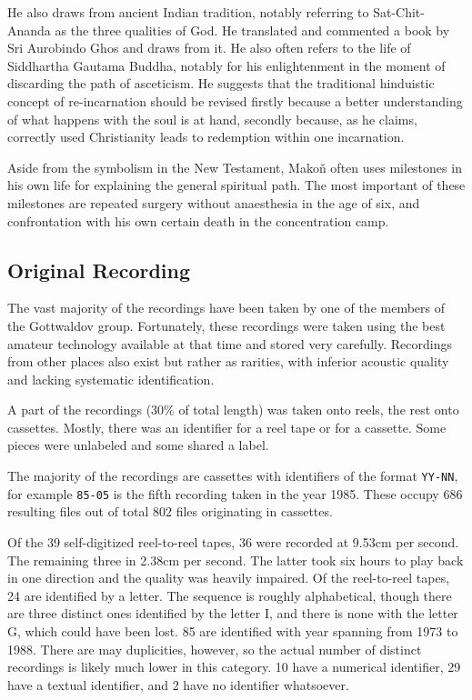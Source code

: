 \documentclass[conference]{IEEEtran}
\begin{document}
He also draws from ancient Indian tradition, notably referring to
Sat-Chit-Ananda as the three qualities of God. He translated and commented a
book by Sri Aurobindo Ghos and draws from it. He also often refers to the life
of Siddhartha Gautama Buddha, notably for his enlightenment in the moment of
discarding the path of asceticism. He suggests that the traditional hinduistic
concept of re-incarnation should be revised firstly because a better
understanding of what happens with the soul is at hand, secondly because, as he
claims, correctly used Christianity leads to redemption within one incarnation.

Aside from the symbolism in the New Testament, Makoň often uses milestones in
his own life for explaining the general spiritual path. The most important of
these milestones are repeated surgery without anaesthesia in the age of six, and
confrontation with his own certain death in the concentration camp.

\subsection{Original Recording}

The vast majority of the recordings have been taken by one of the members
of the Gottwaldov group. Fortunately, these recordings were taken using the best
amateur technology available at that time and stored very carefully. Recordings
from other places also exist but rather as rarities, with inferior acoustic
quality and lacking systematic identification.

A part of the recordings (30\% of total length) was taken onto reels, the rest onto cassettes. Mostly, there was an identifier for a reel tape or for a cassette. Some pieces were unlabeled and some shared a label. 

The majority of the recordings are cassettes with
identifiers of the format \texttt{YY-NN}, for example \texttt{85-05} is the fifth recording taken in the year 1985. These occupy 686 resulting files out of total 802 files originating in cassettes.

Of the 39 self-digitized reel-to-reel tapes, 36 were recorded at 9.53cm per
second. The remaining three in 2.38cm per second. The latter took six hours to
play back in one direction and the quality was heavily impaired. Of the
reel-to-reel tapes, 24 are identified by a letter. The sequence
is roughly alphabetical, though there
are three distinct ones identified by the letter I, and there is none with the
letter G, which could have been lost. 85 are identified with year spanning from
1973 to 1988. There are may duplicities, however, so the actual number of
distinct recordings is likely much lower in this category. 10 have a numerical
identifier, 29 have a textual identifier, and 2 have no identifier whatsoever.
\end{document}
